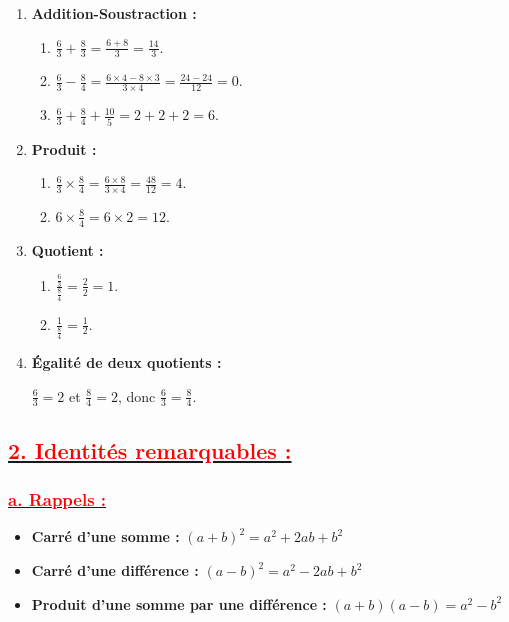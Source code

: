 \documentclass[12pt]{article}
\begin{document}
\begin{enumerate}
    \item \textbf{Addition-Soustraction :}
        \begin{enumerate}
            \item $\frac{6}{3} + \frac{8}{3} = \frac{6 + 8}{3} = \frac{14}{3}$.
            \item $\frac{6}{3} - \frac{8}{4} = \frac{6 \times 4 - 8 \times 3}{3 \times 4} = \frac{24 - 24}{12} = 0$.
            \item $\frac{6}{3} + \frac{8}{4} + \frac{10}{5} = 2 + 2 + 2 = 6$.
        \end{enumerate}
    
    \item \textbf{Produit :}
        \begin{enumerate}
            \item $\frac{6}{3} \times \frac{8}{4} = \frac{6 \times 8}{3 \times 4} = \frac{48}{12} = 4$.
            \item $6 \times \frac{8}{4} = 6 \times 2 = 12$.
        \end{enumerate}
    
    \item \textbf{Quotient :}
        \begin{enumerate}
            \item $\frac{\frac{6}{3}}{\frac{8}{4}} = \frac{2}{2} = 1$.
            \item $\frac{1}{\frac{8}{4}} = \frac{1}{2}$.
        \end{enumerate}
    
    \item \textbf{Égalité de deux quotients :}
    
    $\frac{6}{3} = 2$ et $\frac{8}{4} = 2$, donc $\frac{6}{3} = \frac{8}{4}$.
\end{enumerate}

\subsection*{\underline{\textbf{\textcolor{red}{2. Identités remarquables :}}}}
\subsubsection*{\underline{\textbf{\textcolor{red}{a. Rappels :}}}}
\begin{itemize}
    \item \textbf{Carré d'une somme :} \quad $(a + b)^2 = a^2 + 2ab + b^2$
    \item \textbf{Carré d'une différence :} \quad $(a - b)^2 = a^2 - 2ab + b^2$
    \item \textbf{Produit d'une somme par une différence :} \quad $(a + b)(a - b) = a^2 - b^2$
\end{itemize}
\end{document}

